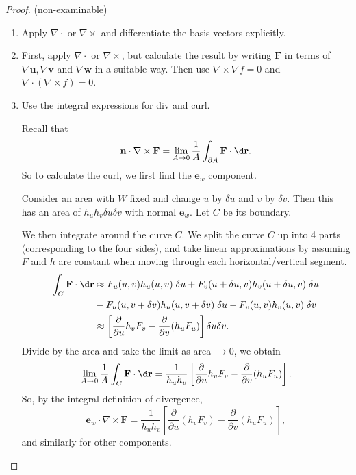 \documentclass[a4paper]{article}
\begin{document}
\begin{proof}(non-examinable)
  \begin{enumerate}
    \item Apply $\nabla\cdot$ or $\nabla\times$ and differentiate the basis vectors explicitly.
    \item First, apply $\nabla\cdot$ or $\nabla\times$, but calculate the result by writing $\mathbf{F}$ in terms of $\nabla \mathbf{u}, \nabla \mathbf{v}$ and $\nabla \mathbf{w}$ in a suitable way. Then use $\nabla\times \nabla f = 0$ and $\nabla\cdot (\nabla\times f) = 0$.
    \item Use the integral expressions for div and curl.

      Recall that
      \[
        \mathbf{n}\cdot \nabla \times \mathbf{F} = \lim_{A \to 0}\frac{1}{A}\int_{\partial A}\mathbf{F}\cdot \d \mathbf{r}.
      \]
      So to calculate the curl, we first find the $\mathbf{e}_w$ component.

      Consider an area with $W$ fixed and change $u$ by $\delta u$ and $v$ by $\delta v$. Then this has an area of $h_u h_v \delta u\delta v$ with normal $\mathbf{e}_w$. Let $C$ be its boundary.
      \begin{center}
      \end{center}

      We then integrate around the curve $C$. We split the curve $C$ up into 4 parts (corresponding to the four sides), and take linear approximations by assuming $F$ and $h$ are constant when moving through each horizontal/vertical segment.
      \begin{align*}
        \int_C \mathbf{F}\cdot \d \mathbf{r} &\approx F_u(u, v) h_u(u, v)\;\delta u + F_v(u + \delta u, v) h_v(u + \delta u, v)\;\delta u \\
        &- F_u(u, v + \delta v)h_u (u, v + \delta v)\; \delta u - F_v(u, v)h_v(u, v)\;\delta v\\
        &\approx \left[\frac{\partial}{\partial u}h_vF_v - \frac{\partial}{\partial v}(h_uF_u)\right]\delta u\delta v.
      \end{align*}
      Divide by the area and take the limit as area $\to 0$, we obtain
      \[
        \lim_{A \to 0} \frac{1}{A}\int_C \mathbf{F}\cdot \d \mathbf{r} = \frac{1}{h_uh_v}\left[\frac{\partial}{\partial u}h_vF_v - \frac{\partial}{\partial v}(h_u F_u)\right].
      \]
      So, by the integral definition of divergence,
      \[
        \mathbf{e}_w\cdot \nabla\times \mathbf{F} = \frac{1}{h_uh_v}\left[\frac{\partial }{\partial u}(h_vF_v) - \frac{\partial }{\partial v}(h_uF_u)\right],
      \]
      and similarly for other components.


\end{enumerate}
\end{proof}
\end{document}
